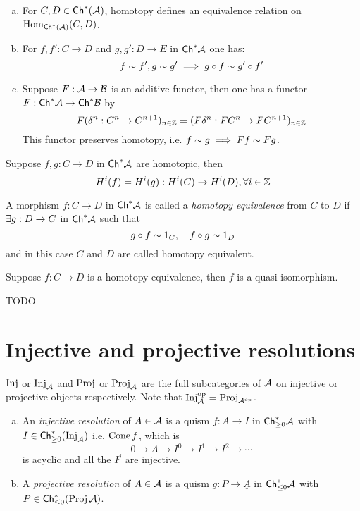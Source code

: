 \documentclass[a4paper]{report}
\begin{document}
\begin{prop}
\begin{enumerate}[(a)]
  \item For $C, D \in \mathsf{Ch}^*(\mathcal{A})$, homotopy defines an equivalence relation on $\operatorname{Hom}_{\mathsf{Ch}^*(\mathcal{A})}(C,D)$.
  \item For $f, f': C \to D$ and $g, g' : D \to E$ in $\mathsf{Ch}^* \mathcal{A}$ one has: \[f \sim f', g \sim g' \implies g \circ f \sim g' \circ f'\]
  \item Suppose $F: \mathcal{A} \to \mathcal B$ is an additive functor, then one has a functor $F: \mathsf{Ch}^* \mathcal{A} \to \mathsf{Ch}^* \mathcal B$ by \[F(\delta^{n}: C^{n} \to C^{n+1})_{n \in \mathbb{Z}} = (F\delta^{n}: FC^{n} \to FC^{n+1})_{n \in \mathbb{Z}}\]
        This functor preserves homotopy, i.e. $f \sim g \implies Ff \sim Fg$.
\end{enumerate}

\end{prop}




\begin{prop}
Suppose $f, g : C \to D$ in $\mathsf{Ch}^* \mathcal{A}$ are homotopic, then \[H^{i}(f)= H^{i}(g): H^{i}(C) \to H^{i}(D), \forall i \in \mathbb{Z}\]
\end{prop}

\begin{defi}
  A morphism $f: C \to D$ in $\mathsf{Ch}^* \mathcal{A}$ is called a \emph{homotopy equivalence} from $C$ to $D$ if $\exists g: D \to C$ in $\mathsf{Ch}^* \mathcal{A}$ such that \[g \circ f \sim 1_{C}, \quad f \circ g \sim 1_{D}\]and in this case $C$ and $D$ are called homotopy equivalent.
\end{defi}

\begin{prop}
Suppose $f: C \to D$ is a homotopy equivalence, then $f$ is a quasi-isomorphism.
\end{prop}
\begin{exmp*}TODO

\end{exmp*}

\section{Injective and projective resolutions}
\begin{nota*}
  $\operatorname{Inj}$ or $\operatorname{Inj}_{\mathcal{A}}$ and $\operatorname{Proj}$ or $\operatorname{Proj}_{\mathcal{A}}$ are the full subcategories of $\mathcal{A}$ on injective or projective objects respectively. Note that $\operatorname{Inj}_{\mathcal{A}}^\mathrm{op} = \operatorname{Proj}_{\mathcal{A}^\mathrm{op}}$.
\end{nota*}

\begin{defi}
\begin{enumerate}[(a)]
  \item An \emph{injective resolution} of $A \in \mathcal{A}$ is a quism $f: \underline A \to I$ in $\mathsf{Ch}^*_{\ge 0} \mathcal{A}$ with $I \in \mathsf{Ch}^*_{\ge 0} (\operatorname{Inj}_{\mathcal{A}})$ i.e. $\operatorname{Cone} f$, which is \[0 \to A \to I^{0} \to I^{1} \to I^{2}\to \cdots\] is acyclic and all the $I^{j}$ are injective.
  \item A \emph{projective resolution} of $A \in \mathcal{A}$ is a quism $g: P \to \underline A$ in $\mathsf{Ch}^*_{\le 0} \mathcal{A}$ with $P \in \mathsf{Ch}^*_{\le 0}(\operatorname{Proj} \mathcal{A})$.
\end{enumerate}

\end{defi}
\end{document}
